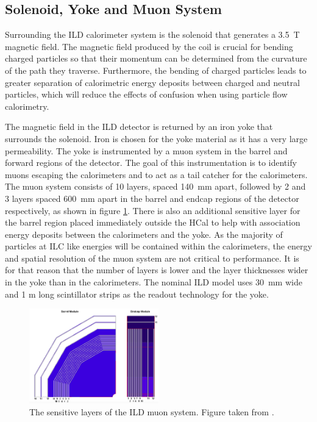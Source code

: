\subsection{Solenoid, Yoke and Muon System}
Surrounding the ILD calorimeter system is the solenoid that generates a 3.5~T magnetic field.  The magnetic field produced by the coil is crucial for bending charged particles so that their momentum can be determined from the curvature of the path they traverse.  Furthermore, the bending of charged particles leads to greater separation of calorimetric energy deposits between charged and neutral particles, which will reduce the effects of confusion when using particle flow calorimetry.  

The magnetic field in the ILD detector is returned by an iron yoke that surrounds the solenoid.  Iron is chosen for the yoke material as it has a very large permeability.  The yoke is instrumented by a muon system in the barrel and forward regions of the detector.  The goal of this instrumentation is to identify muons escaping the calorimeters and to act as a tail catcher for the calorimeters.  The muon system consists of 10 layers, spaced 140~mm apart, followed by 2 and 3 layers spaced 600~mm apart in the barrel and endcap regions of the detector respectively, as shown in figure \ref{fig:muon}.  There is also an additional sensitive layer for the barrel region placed immediately outside the HCal to help with association energy deposits between the calorimeters and the yoke.  As the majority of particles at ILC like energies will be contained within the calorimeters, the energy and spatial resolution of the muon system are not critical to performance.  It is for that reason that the number of layers is lower and the layer thicknesses wider in the yoke than in the calorimeters.  The nominal ILD model uses 30~mm wide and 1 m long scintillator strips as the readout technology for the yoke.

\begin{figure}[h!]
\centering
\includegraphics[width=0.5\textwidth]{LCDetectorsAndPFlow/Plots/Pictures/Muon.png}
\caption[The sensitive layers of the ILD muon system.  Figure taken from  \cite{Behnke:2013lya}.]{The sensitive layers of the ILD muon system.  Figure taken from  \cite{Behnke:2013lya}.}
\label{fig:muon}
\end{figure}   

